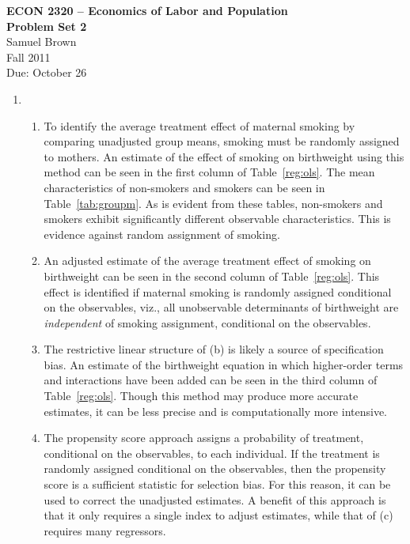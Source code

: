 \documentclass{article}
\begin{document}
\begin{center}
\textbf{ECON 2320 -- Economics of Labor and Population} \\
\textbf{Problem Set 2} \\
Samuel Brown \\
Fall 2011 \\
Due: October 26

\end{center}
\bigskip

\arraycolsep 1pt

\begin{enumerate}
\item \begin{enumerate}

\item To identify the average treatment effect of maternal smoking by comparing unadjusted group means, smoking must be randomly assigned to mothers. An estimate of the effect of smoking on birthweight using this method can be seen in the first column of Table~\ref{reg:ols}. The mean characteristics of non-smokers and smokers can be seen in Table~\ref{tab:groupm}. As is evident from these tables, non-smokers and smokers exhibit significantly different observable characteristics. This is evidence against random assignment of smoking.



\item An adjusted estimate of the average treatment effect of smoking on birthweight can be seen in the second column of Table~\ref{reg:ols}. This effect is identified if maternal smoking is randomly assigned conditional on the observables, viz., all unobservable determinants of birthweight are {\em independent} of smoking assignment, conditional on the observables.

\item The restrictive linear structure of (b) is likely a source of specification bias. An estimate of the birthweight equation in which higher-order terms and interactions have been added can be seen in the third column of Table~\ref{reg:ols}. Though this method may produce more accurate estimates, it can be less precise and is computationally more intensive.



\item The propensity score approach assigns a probability of treatment, conditional on the observables, to each individual. If the treatment is randomly assigned conditional on the observables, then the propensity score is a sufficient statistic for selection bias. For this reason, it can be used to correct the unadjusted estimates. A benefit of this approach is that it only requires a single index to adjust estimates, while that of (c) requires many regressors.


\end{enumerate}
\end{enumerate}
\end{document}
